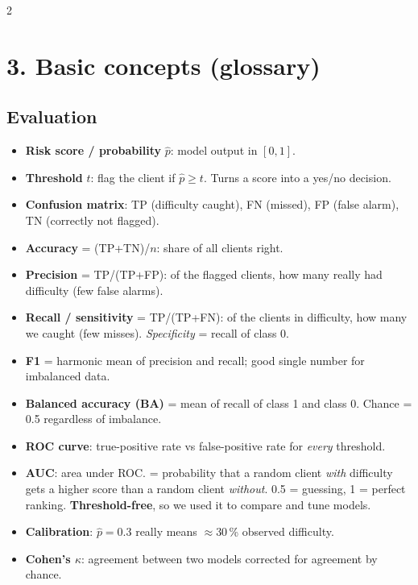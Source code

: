 \documentclass[a4paper,9pt]{extarticle}
\newcommand{\term}[1]{\textbf{\color{accent}#1}}
\begin{document}
\begin{multicols}{2}
\section{3. Basic concepts (glossary)}
\subsection{Evaluation}
\begin{itemize}
\item \term{Risk score / probability} $\hat p$: model output in $[0,1]$.
\item \term{Threshold} $t$: flag the client if $\hat p \geq t$. Turns a score into a yes/no decision.
\item \term{Confusion matrix}: TP (difficulty caught), FN (missed), FP (false alarm), TN (correctly not flagged).
\item \term{Accuracy} = (TP+TN)/$n$: share of all clients right.
\item \term{Precision} = TP/(TP+FP): of the flagged clients, how many really had difficulty (few false alarms).
\item \term{Recall / sensitivity} = TP/(TP+FN): of the clients in difficulty, how many we caught (few misses).
      \emph{Specificity} = recall of class 0.
\item \term{F1} = harmonic mean of precision and recall; good single number for imbalanced data.
\item \term{Balanced accuracy (BA)} = mean of recall of class 1 and class 0. Chance = 0.5 regardless of imbalance.
\item \term{ROC curve}: true-positive rate vs false-positive rate for \emph{every} threshold.
\item \term{AUC}: area under ROC. = probability that a random client \emph{with} difficulty gets a higher score than
      a random client \emph{without}. 0.5 = guessing, 1 = perfect ranking. \textbf{Threshold-free}, so we used
      it to compare and tune models.
\item \term{Calibration}: $\hat p = 0.3$ really means $\approx$30\,\% observed difficulty.
\item \term{Cohen's $\kappa$}: agreement between two models corrected for agreement by chance.
\end{itemize}


\end{multicols}
\end{document}
